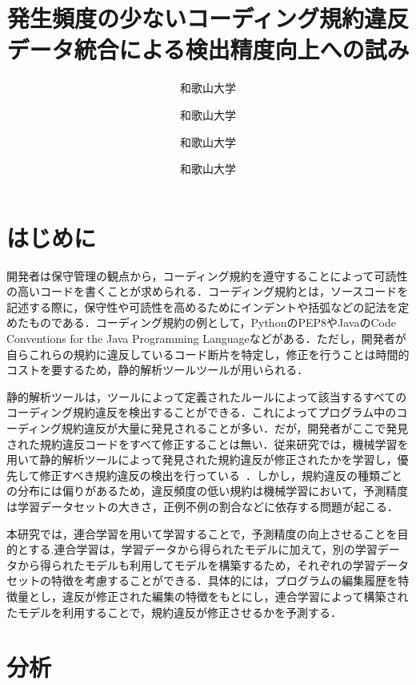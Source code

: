 \documentclass[uplatex,dvipdfmx,a4paper,twocolumn,base=11pt,jbase=11pt,ja=standard]{bxjsarticle}  %
\title{発生頻度の少ないコーディング規約違反データ統合による検出精度向上への試み}{Toward improving detection accuracy by integrating occasional coding convention violations datasets}
\author{和歌山大学}{亀岡　令}{Ryo Kameoka, Wakayama University}
\author{和歌山大学}{伊原 彰紀}{Akinori Ihara, Wakayama University}
\author{和歌山大学}{南 雄太}{Yuta Minami, Wakayama University}
\author{和歌山大学}{大森　楓木}{Fuki Omori, Wakayama University}
\begin{document}
\maketitle

\section{はじめに}
開発者は保守管理の観点から，コーディング規約を遵守することによって可読性の高いコードを書くことが求められる．コーディング規約とは，ソースコードを記述する際に，保守性や可読性を高めるためにインデントや括弧などの記法を定めたものである．コーディング規約の例として，PythonのPEP8やJavaのCode Conventions for the Java Programming Languageなどがある．ただし，開発者が自らこれらの規約に違反しているコード断片を特定し，修正を行うことは時間的コストを要するため，静的解析ツールツールが用いられる．


静的解析ツールは，ツールによって定義されたルールによって該当するすべてのコーディング規約違反を検出することができる．これによってプログラム中のコーディング規約違反が大量に発見されることが多い．だが，開発者がここで発見された規約違反コードをすべて修正することは無い．従来研究では，機械学習を用いて静的解析ツールによって発見された規約違反が修正されたかを学習し，優先して修正すべき規約違反の検出を行っている~\cite{article1}．しかし，規約違反の種類ごとの分布には偏りがあるため，違反頻度の低い規約は機械学習において，予測精度は学習データセットの大きさ，正例不例の割合などに依存する問題が起こる．

本研究では，連合学習を用いて学習することで，予測精度の向上させることを目的とする.連合学習は，学習データから得られたモデルに加えて，別の学習データから得られたモデルも利用してモデルを構築するため，それぞれの学習データセットの特徴を考慮することができる．具体的には，プログラムの編集履歴を特徴量とし，違反が修正された編集の特徴をもとにし，連合学習によって構築されたモデルを利用することで，規約違反が修正させるかを予測する．
\section{分析}







\end{document}

